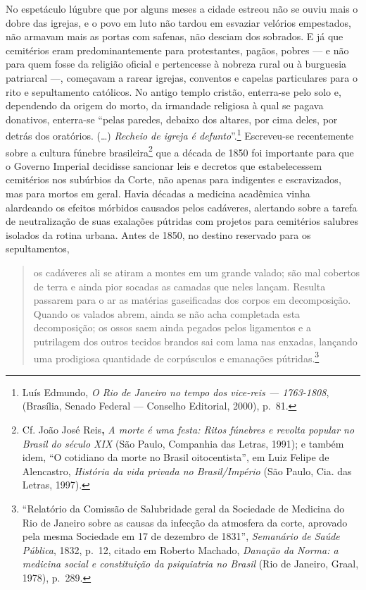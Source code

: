 No espetáculo lúgubre que por alguns meses a cidade estreou não se ouviu
mais o dobre das igrejas, e o povo em luto não tardou em esvaziar
velórios empestados, não armavam mais as portas com safenas, não desciam
dos sobrados. E já que cemitérios eram predominantemente para
protestantes, pagãos, pobres --- e não para quem fosse da religião
oficial e pertencesse à nobreza rural ou à burguesia patriarcal ---,
começavam a rarear igrejas, conventos e capelas particulares para o rito
e sepultamento católicos. No antigo templo cristão, enterra-se pelo solo
e, dependendo da origem do morto, da irmandade religiosa à qual se
pagava donativos, enterra-se ``pelas paredes, debaixo dos altares, por
cima deles, por detrás dos oratórios. (\ldots{}) \textit{Recheio de igreja
é defunto}''.\footnote{Luís Edmundo, \textit{O Rio de Janeiro no tempo dos
  vice-reis --- 1763-1808}, (Brasília, Senado Federal --- Conselho
  Editorial, 2000), p.~81.} Escreveu-se recentemente sobre a cultura
fúnebre brasileira\footnote{Cf. João José Reis\textbf{,} \textit{A morte é
  uma festa: Ritos fúnebres e revolta popular no Brasil do século XIX}
  (São Paulo, Companhia das Letras, 1991); e também idem, ``O cotidiano
  da morte no Brasil oitocentista'', em Luiz Felipe de Alencastro,
  \textit{História da vida privada no Brasil/Império} (São Paulo, Cia. das
  Letras, 1997).} que a década de 1850 foi importante para que o Governo
Imperial decidisse sancionar leis e decretos que estabelecessem
cemitérios nos subúrbios da Corte, não apenas para indigentes e
escravizados, mas para mortos em geral. Havia décadas a medicina
acadêmica vinha alardeando os efeitos mórbidos causados pelos cadáveres,
alertando sobre a tarefa de neutralização de suas exalações pútridas com
projetos para cemitérios salubres isolados da rotina urbana. Antes de
1850, no destino reservado para os sepultamentos,

\begin{quote}
os cadáveres ali se atiram a montes em um grande valado; são mal
cobertos de terra e ainda pior socadas as camadas que neles lançam.
Resulta passarem para o ar as matérias gaseificadas dos corpos em
decomposição. Quando os valados abrem, ainda se não acha completada esta
decomposição; os ossos saem ainda pegados pelos ligamentos e a
putrilagem dos outros tecidos brandos sai com lama nas enxadas, lançando
uma prodigiosa quantidade de corpúsculos e emanações pútridas.\footnote{``Relatório
  da Comissão de Salubridade geral da Sociedade de Medicina do Rio de
  Janeiro sobre as causas da infecção da atmosfera da corte, aprovado
  pela mesma Sociedade em 17 de dezembro de 1831'', \textit{Semanário de
  Saúde Pública}, 1832, p.~12, citado em Roberto Machado, \textit{Danação
  da Norma: a medicina social e constituição da psiquiatria no Brasil}
  (Rio de Janeiro, Graal, 1978), p.~289.}
\end{quote}

